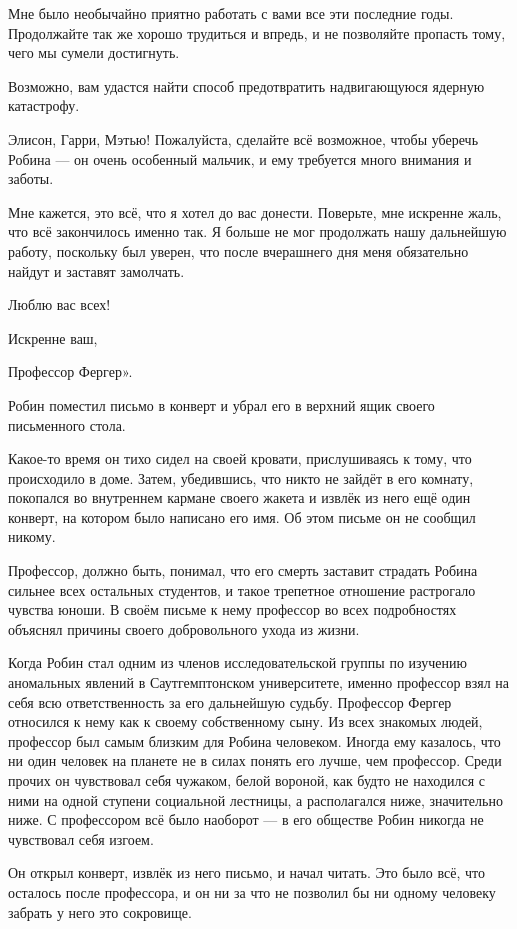 \documentclass[a5paper, 9pt,
final, openany, twoside=true]{memoir}
\begin{document}
Мне было необычайно приятно работать с вами все эти последние годы. Продолжайте так же хорошо трудиться и впредь, и не позволяйте пропасть тому, чего мы сумели достигнуть.

Возможно, вам удастся найти способ предотвратить надвигающуюся ядерную катастрофу.

Элисон, Гарри, Мэтью! Пожалуйста, сделайте всё возможное, чтобы уберечь Робина — он очень особенный мальчик, и ему требуется много внимания и заботы.

Мне кажется, это всё, что я хотел до вас донести. Поверьте, мне искренне жаль, что всё закончилось именно так. Я больше не мог продолжать нашу дальнейшую работу, поскольку был уверен, что после вчерашнего дня меня обязательно найдут и заставят замолчать.\bigskip

Люблю вас всех!\bigskip

Искренне ваш,\bigskip

Профессор Фергер».\bigskip

Робин поместил письмо в конверт и убрал его в верхний ящик своего письменного стола.

Какое-то время он тихо сидел на своей кровати, прислушиваясь к тому, что происходило в доме. Затем, убедившись, что никто не зайдёт в его комнату, покопался во внутреннем кармане своего жакета и извлёк из него ещё один конверт, на котором было написано его имя. Об этом письме он не сообщил никому.

Профессор, должно быть, понимал, что его смерть заставит страдать Робина сильнее всех остальных студентов, и такое трепетное отношение растрогало чувства юноши. В своём письме к нему профессор во всех подробностях объяснял причины своего добровольного ухода из жизни.

Когда Робин стал одним из членов исследовательской группы по изучению аномальных явлений в Саутгемптонском университете, именно профессор взял на себя всю ответственность за его дальнейшую судьбу. Профессор Фергер относился к нему как к своему собственному сыну. Из всех знакомых людей, профессор был самым близким для Робина человеком. Иногда ему казалось, что ни один человек на планете не в силах понять его лучше, чем профессор. Среди прочих он чувствовал себя чужаком, белой вороной, как будто не находился с ними на одной ступени социальной лестницы, а располагался ниже, значительно ниже. С профессором всё было наоборот — в его обществе Робин никогда не чувствовал себя изгоем.

Он открыл конверт, извлёк из него письмо, и начал читать. Это было всё, что осталось после профессора, и он ни за что не позволил бы ни одному человеку забрать у него это сокровище.\\
\end{document}
